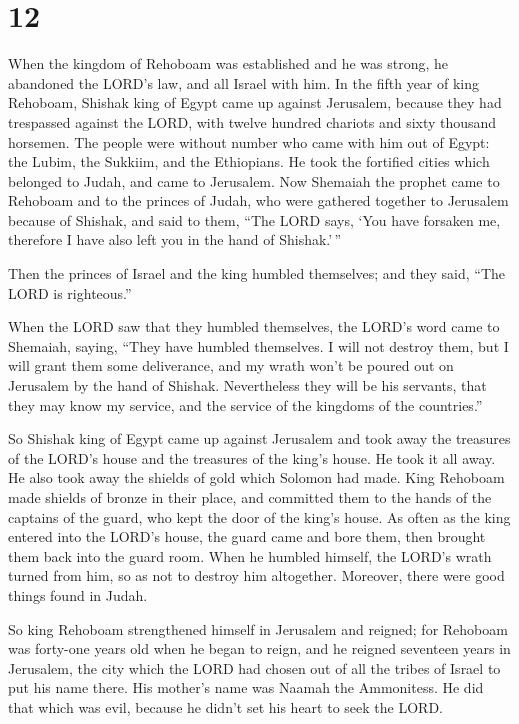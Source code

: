 \hypertarget{section-11}{%
\section{12}\label{section-11}}

 When the kingdom of Rehoboam was established and he was
strong, he abandoned the LORD's law, and all Israel with him.
 In the fifth year of king Rehoboam, Shishak king of Egypt
came up against Jerusalem, because they had trespassed against the LORD,
 with twelve hundred chariots and sixty thousand horsemen.
The people were without number who came with him out of Egypt: the
Lubim, the Sukkiim, and the Ethiopians.  He took the
fortified cities which belonged to Judah, and came to Jerusalem.
 Now Shemaiah the prophet came to Rehoboam and to the
princes of Judah, who were gathered together to Jerusalem because of
Shishak, and said to them, ``The LORD says, `You have forsaken me,
therefore I have also left you in the hand of Shishak.'\,''

 Then the princes of Israel and the king humbled
themselves; and they said, ``The LORD is righteous.''

 When the LORD saw that they humbled themselves, the
LORD's word came to Shemaiah, saying, ``They have humbled themselves. I
will not destroy them, but I will grant them some deliverance, and my
wrath won't be poured out on Jerusalem by the hand of Shishak.
 Nevertheless they will be his servants, that they may
know my service, and the service of the kingdoms of the countries.''

 So Shishak king of Egypt came up against Jerusalem and
took away the treasures of the LORD's house and the treasures of the
king's house. He took it all away. He also took away the shields of gold
which Solomon had made.  King Rehoboam made shields of
bronze in their place, and committed them to the hands of the captains
of the guard, who kept the door of the king's house.  As
often as the king entered into the LORD's house, the guard came and bore
them, then brought them back into the guard room.  When
he humbled himself, the LORD's wrath turned from him, so as not to
destroy him altogether. Moreover, there were good things found in Judah.

 So king Rehoboam strengthened himself in Jerusalem and
reigned; for Rehoboam was forty-one years old when he began to reign,
and he reigned seventeen years in Jerusalem, the city which the LORD had
chosen out of all the tribes of Israel to put his name there. His
mother's name was Naamah the Ammonitess.  He did that
which was evil, because he didn't set his heart to seek the LORD.

